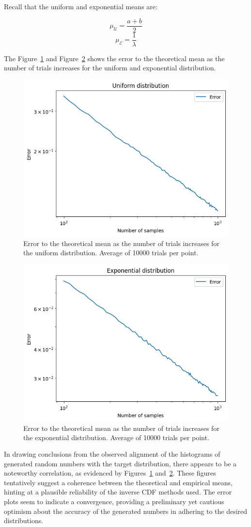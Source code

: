 \documentclass{article}
\begin{document}
Recall that the uniform and exponential means are:

\begin{equation*} \mu_{\mathcal{U}} = \frac{a + b}{2} \end{equation*}
\begin{equation*} \mu_{\mathcal{E}} = \frac{1}{\lambda} \end{equation*}

The Figure~\ref{fig:uniformerrorcdf} and Figure~\ref{fig:exponentialerrorcdf} shows the error to the theoretical mean as the number of trials increases for the uniform and exponential distribution.

\begin{figure}[H]
	\centering
	\includegraphics[width=0.5\linewidth]{./Figures/InverseCDF/uniform_error.png}
	\caption{Error to the theoretical mean as the number of trials increases for the uniform distribution. Average of 10000 trials per point.}
	\label{fig:uniformerrorcdf}
\end{figure}

\begin{figure}[H]
	\centering
	\includegraphics[width=0.5\linewidth]{./Figures/InverseCDF/exponential_error.png}
	\caption{Error to the theoretical mean as the number of trials increases for the exponential distribution. Average of 10000 trials per point.}
	\label{fig:exponentialerrorcdf}
\end{figure}

In drawing conclusions from the observed alignment of the histograms of generated random numbers with the target distribution, there appears to be a noteworthy correlation, as evidenced by Figures~\ref{fig:uniformerrorcdf} and~\ref{fig:exponentialerrorcdf}. These figures tentatively suggest a coherence between the theoretical and empirical means, hinting at a plausible reliability of the inverse CDF methods used. The error plots seem to indicate a convergence, providing a preliminary yet cautious optimism about the accuracy of the generated numbers in adhering to the desired distributions.
\end{document}
